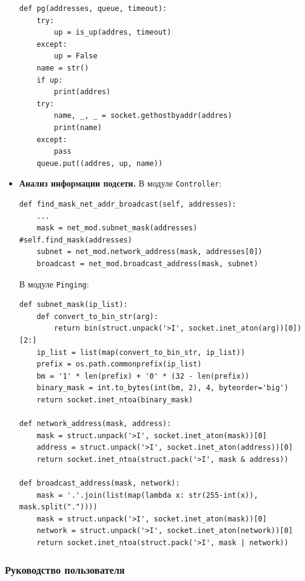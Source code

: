 \documentclass[a4paper]{article}
\begin{document}
\begin{itemize}
			\begin{verbatim}
def pg(addresses, queue, timeout):
    try:
        up = is_up(addres, timeout)
    except:
        up = False
    name = str()
    if up:
        print(addres)
    try:
        name, _, _ = socket.gethostbyaddr(addres)
        print(name)
    except:
        pass
    queue.put((addres, up, name))
			\end{verbatim}
			\item \textbf{Анализ информации подсети.} В модуле \texttt{Controller}:
			\begin{verbatim}
def find_mask_net_addr_broadcast(self, addresses):
    ...
    mask = net_mod.subnet_mask(addresses) #self.find_mask(addresses)
    subnet = net_mod.network_address(mask, addresses[0])
    broadcast = net_mod.broadcast_address(mask, subnet)
			\end{verbatim}
			
			
			 В модуле \texttt{Pinging}:
			 \begin{verbatim}
def subnet_mask(ip_list):
    def convert_to_bin_str(arg):
        return bin(struct.unpack('>I', socket.inet_aton(arg))[0])[2:]
    ip_list = list(map(convert_to_bin_str, ip_list))
    prefix = os.path.commonprefix(ip_list)
    bm = '1' * len(prefix) + '0' * (32 - len(prefix))
    binary_mask = int.to_bytes(int(bm, 2), 4, byteorder='big')
    return socket.inet_ntoa(binary_mask)
    
def network_address(mask, address):
    mask = struct.unpack('>I', socket.inet_aton(mask))[0]
    address = struct.unpack('>I', socket.inet_aton(address))[0]
    return socket.inet_ntoa(struct.pack('>I', mask & address))
    
def broadcast_address(mask, network):
    mask = '.'.join(list(map(lambda x: str(255-int(x)), mask.split("."))))
    mask = struct.unpack('>I', socket.inet_aton(mask))[0]
    network = struct.unpack('>I', socket.inet_aton(network))[0]
    return socket.inet_ntoa(struct.pack('>I', mask | network))
			\end{verbatim}
			 
			
		\end{itemize}
			
		\subsubsection{Руководство пользователя}
\end{document}
